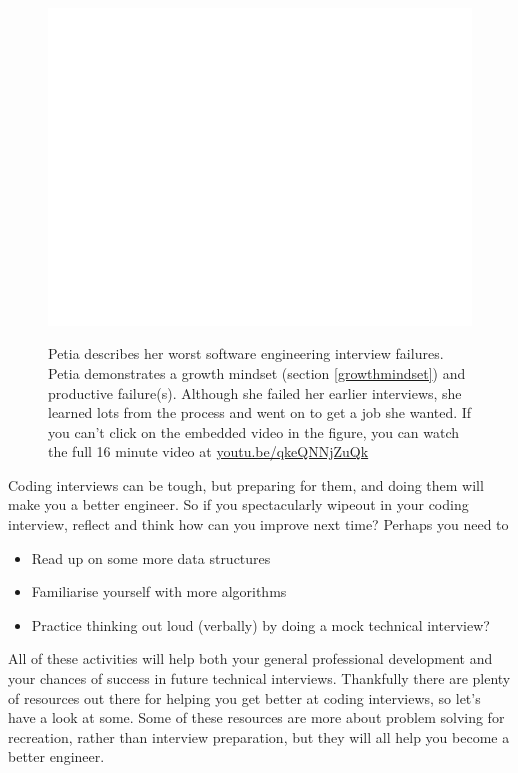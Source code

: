 \documentclass[
]{book}
\providecommand{\tightlist}{%
  \setlength{\itemsep}{0pt}\setlength{\parskip}{0pt}}
\begin{document}
\begin{figure}

{\centering \href{https://www.youtube.com/embed/qkeQNNjZuQk}{\includegraphics[width=0.99\linewidth]{cdyf_files/figure-latex/petia-fig-1} }

}

\caption{Petia describes her worst software engineering interview failures. Petia demonstrates a growth mindset (section \ref{growthmindset}) and productive failure(s). Although she failed her earlier interviews, she learned lots from the process and went on to get a job she wanted. If you can't click on the embedded video in the figure, you can watch the full 16 minute video at \href{https://youtu.be/qkeQNNjZuQk}{youtu.be/qkeQNNjZuQk} \citep{youtube-petia}}\label{fig:petia-fig}
\end{figure}



Coding interviews can be tough, but preparing for them, and doing them will make you a better engineer. So if you spectacularly wipeout in your coding interview, reflect and think how can you improve next time? Perhaps you need to

\begin{itemize}
\tightlist
\item
  Read up on some more data structures
\item
  Familiarise yourself with more algorithms
\item
  Practice thinking out loud (verbally) by doing a mock technical interview?
\end{itemize}

All of these activities will help both your general professional development and your chances of success in future technical interviews. Thankfully there are plenty of resources out there for helping you get better at coding interviews, so let's have a look at some. Some of these resources are more about problem solving for recreation, rather than interview preparation, but they will all help you become a better engineer.
\end{document}
